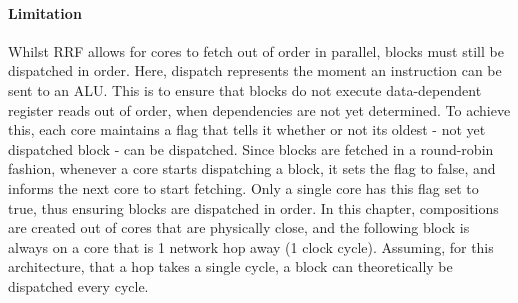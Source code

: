 
\paragraph*{Limitation}

Whilst RRF allows for cores to fetch out of order in parallel, blocks must still be dispatched in order.
Here, dispatch represents the moment an instruction can be sent to an ALU.
This is to ensure that blocks do not execute data-dependent register reads out of order, when dependencies are not yet determined.
To achieve this, each core maintains a flag that tells it whether or not its oldest - not yet dispatched block - can be dispatched.
Since blocks are fetched in a round-robin fashion, whenever a core starts dispatching a block, it sets the flag to false, and informs the next core to start fetching.
Only a single core has this flag set to true, thus ensuring blocks are dispatched in order.
In this chapter, compositions are created out of cores that are physically close, and the following block is always on a core that is 1 network hop away (1 clock cycle).
Assuming, for this architecture, that a hop takes a single cycle, a block can theoretically be dispatched every cycle.



